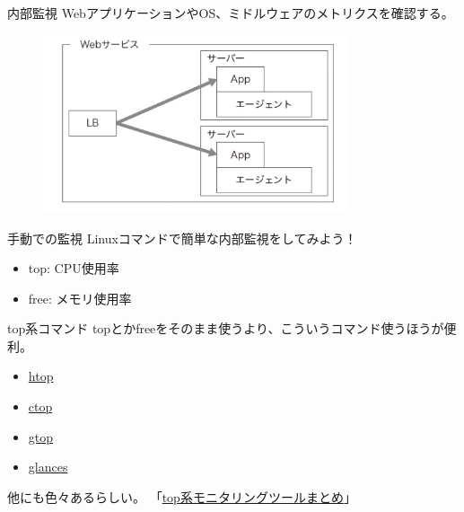 \documentclass{beamer}
\begin{document}
\begin{frame}{内部監視}
  WebアプリケーションやOS、ミドルウェアのメトリクスを確認する。
  \begin{figure}
    \centering
    \includegraphics[clip, keepaspectratio, width=90mm]{./fig/internal_monitoring.png}
  \end{figure}
\end{frame}

\begin{frame}{手動での監視}
  Linuxコマンドで簡単な内部監視をしてみよう！
  \begin{itemize}
    \item top: CPU使用率
    \item free: メモリ使用率
  \end{itemize}
\end{frame}

\begin{frame}{top系コマンド}
  topとかfreeをそのまま使うより、こういうコマンド使うほうが便利。
  \begin{itemize}
    \item \href{https://htop.dev}{htop}
    \item \href{https://ctop.sh/}{ctop}
    \item \href{https://github.com/aksakalli/gtop}{gtop}
    \item \href{https://github.com/nicolargo/glances}{glances}
  \end{itemize}
  他にも色々あるらしい。
  「\href{https://qiita.com/bezeklik/items/980d987ad0afd264bfb0}{top系モニタリングツールまとめ}」
\end{frame}
\end{document}

